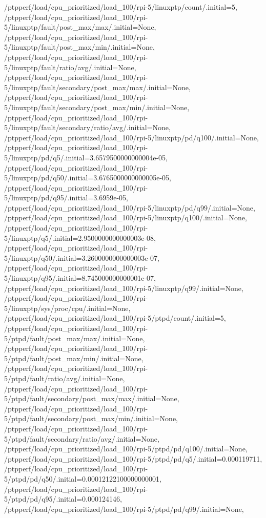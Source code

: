 {    /ptpperf/load/cpu_prioritized/load_100/rpi-5/linuxptp/count/.initial=5,
    /ptpperf/load/cpu_prioritized/load_100/rpi-5/linuxptp/fault/post_max/max/.initial=None,
    /ptpperf/load/cpu_prioritized/load_100/rpi-5/linuxptp/fault/post_max/min/.initial=None,
    /ptpperf/load/cpu_prioritized/load_100/rpi-5/linuxptp/fault/ratio/avg/.initial=None,
    /ptpperf/load/cpu_prioritized/load_100/rpi-5/linuxptp/fault/secondary/post_max/max/.initial=None,
    /ptpperf/load/cpu_prioritized/load_100/rpi-5/linuxptp/fault/secondary/post_max/min/.initial=None,
    /ptpperf/load/cpu_prioritized/load_100/rpi-5/linuxptp/fault/secondary/ratio/avg/.initial=None,
    /ptpperf/load/cpu_prioritized/load_100/rpi-5/linuxptp/pd/q100/.initial=None,
    /ptpperf/load/cpu_prioritized/load_100/rpi-5/linuxptp/pd/q5/.initial=3.6579500000000004e-05,
    /ptpperf/load/cpu_prioritized/load_100/rpi-5/linuxptp/pd/q50/.initial=3.6765000000000005e-05,
    /ptpperf/load/cpu_prioritized/load_100/rpi-5/linuxptp/pd/q95/.initial=3.6959e-05,
    /ptpperf/load/cpu_prioritized/load_100/rpi-5/linuxptp/pd/q99/.initial=None,
    /ptpperf/load/cpu_prioritized/load_100/rpi-5/linuxptp/q100/.initial=None,
    /ptpperf/load/cpu_prioritized/load_100/rpi-5/linuxptp/q5/.initial=2.9500000000000003e-08,
    /ptpperf/load/cpu_prioritized/load_100/rpi-5/linuxptp/q50/.initial=3.2600000000000003e-07,
    /ptpperf/load/cpu_prioritized/load_100/rpi-5/linuxptp/q95/.initial=8.745000000000001e-07,
    /ptpperf/load/cpu_prioritized/load_100/rpi-5/linuxptp/q99/.initial=None,
    /ptpperf/load/cpu_prioritized/load_100/rpi-5/linuxptp/sys/proc/cpu/.initial=None,
    /ptpperf/load/cpu_prioritized/load_100/rpi-5/ptpd/count/.initial=5,
    /ptpperf/load/cpu_prioritized/load_100/rpi-5/ptpd/fault/post_max/max/.initial=None,
    /ptpperf/load/cpu_prioritized/load_100/rpi-5/ptpd/fault/post_max/min/.initial=None,
    /ptpperf/load/cpu_prioritized/load_100/rpi-5/ptpd/fault/ratio/avg/.initial=None,
    /ptpperf/load/cpu_prioritized/load_100/rpi-5/ptpd/fault/secondary/post_max/max/.initial=None,
    /ptpperf/load/cpu_prioritized/load_100/rpi-5/ptpd/fault/secondary/post_max/min/.initial=None,
    /ptpperf/load/cpu_prioritized/load_100/rpi-5/ptpd/fault/secondary/ratio/avg/.initial=None,
    /ptpperf/load/cpu_prioritized/load_100/rpi-5/ptpd/pd/q100/.initial=None,
    /ptpperf/load/cpu_prioritized/load_100/rpi-5/ptpd/pd/q5/.initial=0.000119711,
    /ptpperf/load/cpu_prioritized/load_100/rpi-5/ptpd/pd/q50/.initial=0.00012122100000000001,
    /ptpperf/load/cpu_prioritized/load_100/rpi-5/ptpd/pd/q95/.initial=0.000124146,
    /ptpperf/load/cpu_prioritized/load_100/rpi-5/ptpd/pd/q99/.initial=None,
}
